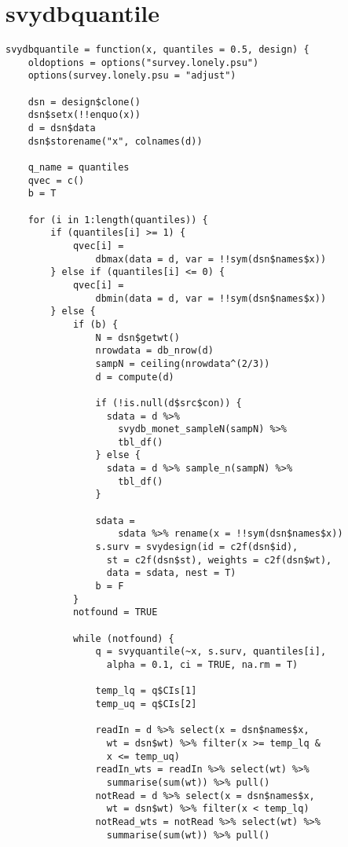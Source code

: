 \section{svydbquantile}

\begin{lstlisting}
svydbquantile = function(x, quantiles = 0.5, design) {
    oldoptions = options("survey.lonely.psu")
    options(survey.lonely.psu = "adjust")
    
    dsn = design$clone()
    dsn$setx(!!enquo(x))
    d = dsn$data
    dsn$storename("x", colnames(d))
    
    q_name = quantiles
    qvec = c()
    b = T
    
    for (i in 1:length(quantiles)) {
        if (quantiles[i] >= 1) {
            qvec[i] = 
                dbmax(data = d, var = !!sym(dsn$names$x))
        } else if (quantiles[i] <= 0) {
            qvec[i] = 
                dbmin(data = d, var = !!sym(dsn$names$x))
        } else {
            if (b) {
                N = dsn$getwt()
                nrowdata = db_nrow(d)
                sampN = ceiling(nrowdata^(2/3))
                d = compute(d)
                
                if (!is.null(d$src$con)) {
                  sdata = d %>% 
                    svydb_monet_sampleN(sampN) %>% 
                    tbl_df()
                } else {
                  sdata = d %>% sample_n(sampN) %>% 
                    tbl_df()
                }
                
                sdata = 
                    sdata %>% rename(x = !!sym(dsn$names$x))
                s.surv = svydesign(id = c2f(dsn$id), 
                  st = c2f(dsn$st), weights = c2f(dsn$wt), 
                  data = sdata, nest = T)
                b = F
            }
            notfound = TRUE
            
            while (notfound) {
                q = svyquantile(~x, s.surv, quantiles[i], 
                  alpha = 0.1, ci = TRUE, na.rm = T)
                
                temp_lq = q$CIs[1]
                temp_uq = q$CIs[2]
                
                readIn = d %>% select(x = dsn$names$x, 
                  wt = dsn$wt) %>% filter(x >= temp_lq & 
                  x <= temp_uq)
                readIn_wts = readIn %>% select(wt) %>% 
                  summarise(sum(wt)) %>% pull()
                notRead = d %>% select(x = dsn$names$x, 
                  wt = dsn$wt) %>% filter(x < temp_lq)
                notRead_wts = notRead %>% select(wt) %>% 
                  summarise(sum(wt)) %>% pull()
                

\end{lstlisting}

